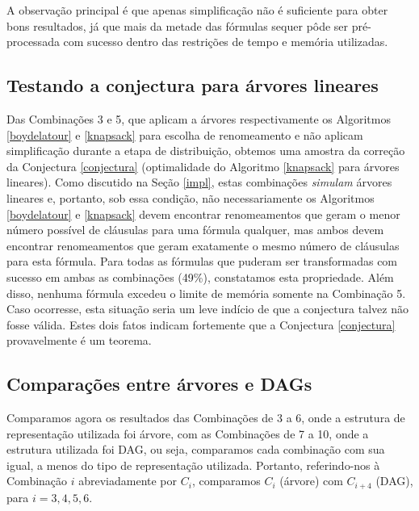 A observação principal é que apenas simplificação não é suficiente para obter bons resultados, já que mais da metade das fórmulas sequer pôde ser pré-processada com sucesso dentro das restrições de tempo e memória utilizadas.

\subsection{Testando a conjectura para árvores lineares}

\indent

Das Combinações 3 e 5, que aplicam a árvores respectivamente os Algoritmos \ref{boydelatour} e \ref{knapsack} para escolha de renomeamento e não aplicam simplificação durante a etapa de distribuição, obtemos uma amostra da correção da Conjectura \ref{conjectura} (optimalidade do Algoritmo \ref{knapsack} para árvores lineares). Como discutido na Seção \ref{impl}, estas combinações \emph{simulam} árvores lineares e, portanto, sob essa condição, não necessariamente os Algoritmos \ref{boydelatour} e \ref{knapsack} devem encontrar renomeamentos que geram o menor número possível de cláusulas para uma fórmula qualquer, mas ambos devem encontrar renomeamentos que geram exatamente o mesmo número de cláusulas para esta fórmula. Para todas as fórmulas que puderam ser transformadas com sucesso em ambas as combinações (49\%), constatamos esta propriedade. Além disso, nenhuma fórmula excedeu o limite de memória somente na Combinação 5. Caso ocorresse, esta situação seria um leve indício de que a conjectura talvez não fosse válida. Estes dois fatos indicam fortemente que a Conjectura \ref{conjectura} provavelmente é um teorema.

\subsection{Comparações entre árvores e DAGs}
\label{secao_tree_x_dag}

\indent

Comparamos agora os resultados das Combinações de 3 a 6, onde a estrutura de representação utilizada foi árvore, com as Combinações de 7 a 10, onde a estrutura utilizada foi DAG, ou seja, comparamos cada combinação com sua igual, a menos do tipo de representação utilizada. Portanto, referindo-nos à Combinação $i$ abreviadamente por $C_i$, comparamos $C_i$ (árvore) com $C_{i+4}$ (DAG), para $i=3,4,5,6$.

